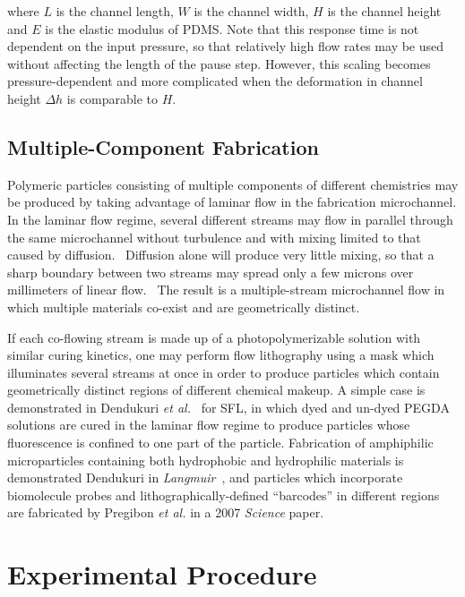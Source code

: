 where $L$ is the channel length, $W$ is the channel width, $H$ is the channel height and $E$ is the elastic
modulus of PDMS.  Note that this response time is not dependent on the input pressure, so that relatively high
flow rates may be used without affecting the length of the pause step. However, this scaling becomes pressure-dependent
and more complicated when the deformation in channel height $\Delta h$ is comparable to $H$.~\cite{dendukuri-sfl}

\subsection{Multiple-Component Fabrication}

Polymeric particles consisting of multiple components of different chemistries may be produced by taking advantage
of laminar flow in the fabrication microchannel.  
In the laminar flow regime, several different streams may flow in parallel through
the same microchannel without turbulence and with mixing limited to that caused by 
diffusion.~\cite{stone-laminar}  Diffusion alone
will produce very little mixing, so that a sharp boundary between two streams may spread only a few microns over
millimeters of linear flow.~\cite{mohr-flow} The result is a multiple-stream microchannel flow in which multiple materials
co-exist and are geometrically distinct.

If each co-flowing stream is made up of a photopolymerizable solution with similar curing kinetics, one may perform
flow lithography using a mask which illuminates several streams at once in order
to produce particles which contain geometrically
distinct regions of different chemical makeup.  A simple case 
is demonstrated in Dendukuri \textit{et al.}~\cite{dendukuri-sfl}
for SFL, in which dyed and un-dyed PEGDA solutions are cured in the laminar flow regime to produce particles whose
fluorescence is confined to one part of the particle.  Fabrication of amphiphilic microparticles containing both
hydrophobic and hydrophilic materials is demonstrated Dendukuri in 
\textit{Langmuir}~\cite{dendukuri-amph}, and particles which incorporate biomolecule probes and lithographically-defined
``barcodes'' in different regions are fabricated by Pregibon \textit{et al.} in a 2007 
\textit{Science} paper.~\cite{pregibon-dna}

\section{Experimental Procedure}
\label{sec:rods-exp}

